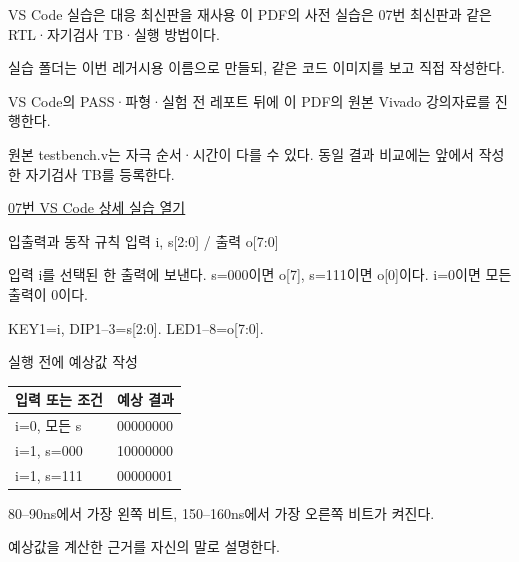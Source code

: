 \begin{frame}{VS Code 실습은 대응 최신판을 재사용}\relax
\small
이 PDF의 사전 실습은 07번 최신판과 같은 RTL·자기검사 TB·실행 방법이다.\par\vspace{0.22cm}실습 폴더는 이번 레거시용 이름으로 만들되, 같은 코드 이미지를 보고 직접 작성한다.\par\vspace{0.22cm}VS Code의 PASS·파형·실험 전 레포트 뒤에 이 PDF의 원본 Vivado 강의자료를 진행한다.\par\vspace{0.22cm}원본 testbench.v는 자극 순서·시간이 다를 수 있다. 동일 결과 비교에는 앞에서 작성한 자기검사 TB를 등록한다.\par\href{04.LAB1_07_DEMUX1TO8_VIVADO.pdf}{07번 VS Code 상세 실습 열기}
\end{frame}

\begin{frame}[label=legacy-07-sim]{입출력과 동작 규칙}\relax
\small
입력 i, s[2:0] / 출력 o[7:0]\par\vspace{0.22cm}입력 i를 선택된 한 출력에 보낸다. s=000이면 o[7], s=111이면 o[0]이다. i=0이면 모든 출력이 0이다.\par\vspace{0.22cm}KEY1=i, DIP1–3=s[2:0]. LED1–8=o[7:0].\par
\end{frame}

\begin{frame}{실행 전에 예상값 작성}\relax
\small
\begin{center}\renewcommand{\arraystretch}{1.45}
\begin{tabular}{l|l}
입력 또는 조건 & 예상 결과\\\hline
i=0, 모든 s & 00000000\\
i=1, s=000 & 10000000\\
i=1, s=111 & 00000001\\
\end{tabular}\end{center}
80–90ns에서 가장 왼쪽 비트, 150–160ns에서 가장 오른쪽 비트가 켜진다.\par\vspace{0.22cm}예상값을 계산한 근거를 자신의 말로 설명한다.\par
\end{frame}


